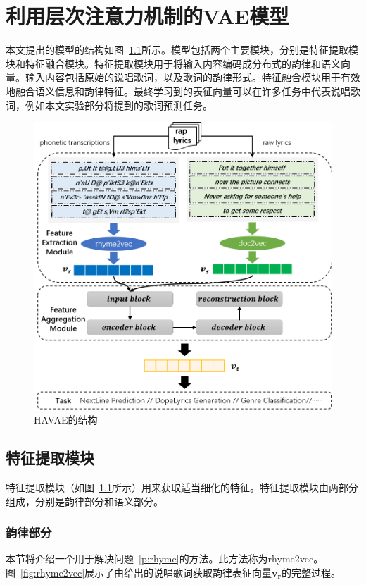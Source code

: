 \chapter{利用层次注意力机制的VAE模型} \label{chpt:model}

本文提出的模型的结构如图~\ref{fig:model}所示。模型包括两个主要模块，分别是特征提取模块和特征融合模块。特征提取模块用于将输入内容编码成分布式的韵律和语义向量。输入内容包括原始的说唱歌词，以及歌词的韵律形式。特征融合模块用于有效地融合语义信息和韵律特征。最终学习到的表征向量可以在许多任务中代表说唱歌词，例如本文实验部分将提到的歌词预测任务。\par
\begin{figure}[h]
  \centering 
  \includegraphics[width=12cm]{model.png}
  \caption{HAVAE的结构}
  \label{fig:model}
\end{figure}

\section{特征提取模块} \label{sec:fe}
特征提取模块（如图~\ref{fig:model}所示）用来获取适当细化的特征。特征提取模块由两部分组成，分别是韵律部分和语义部分。\par

\subsection{韵律部分}
本节将介绍一个用于解决问题~\ref{p:rhyme}的方法。此方法称为rhyme2vec。图~\ref{fig:rhyme2vec}展示了由给出的说唱歌词获取韵律表征向量$\bm {v_r}$的完整过程。\par

